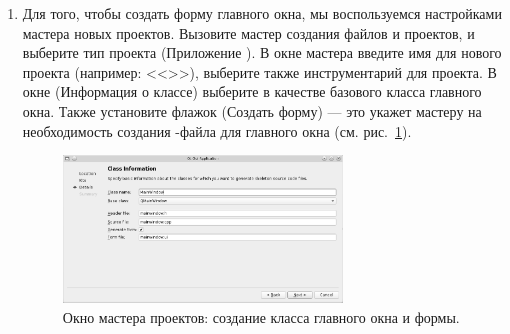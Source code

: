 \begin{enumerate}
\item Для того, чтобы создать форму главного окна, мы воспользуемся настройками мастера новых проектов. Вызовите мастер
создания файлов и проектов, и выберите тип проекта (Приложение ). 
В окне мастера
введите имя для нового проекта (например: <<>>), выберите также
инструментарий для проекта. В окне  (Информация о классе) выберите
 в качестве базового класса главного окна. Также установите флажок 
(Создать форму) --- это укажет мастеру на необходимость
создания -файла для главного окна (см. рис.~\ref{ch15:refDrawing0}).

\begin{figure}[htb]
\begin{center}
\includegraphics[width=0.7\textwidth]{img/ris_15_1}
\caption[Окно мастера проектов: создание класса главного окна и формы.]{Окно мастера проектов: создание класса
главного окна и формы.}
\label{ch15:refDrawing0}
\end{center}
\end{figure}


\end{enumerate}
